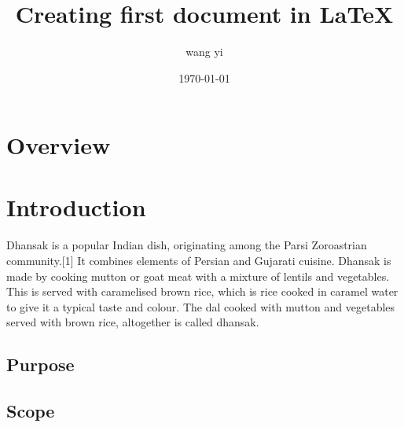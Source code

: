 \documentclass{article}
\title{Creating first document in \LaTeX}
\author{wang yi}
\date{\today}
\begin{document}
    \maketitle
    \tableofcontents
    \section{Overview}
    \section{Introduction}
    \paragraph{}
    Dhansak is a popular Indian dish, originating among the Parsi Zoroastrian community.[1] It combines elements of Persian and Gujarati cuisine. Dhansak is made by cooking mutton or goat meat with a mixture of lentils and vegetables. This is served with caramelised brown rice, which is rice cooked in caramel water to give it a typical taste and colour. The dal cooked with mutton and vegetables served with brown rice, altogether is called dhansak.
    \subsection{Purpose}
    \subsection{Scope}
\end{document}

